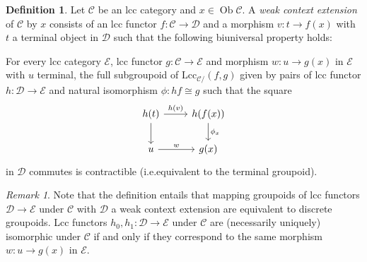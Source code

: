 \documentclass[a4paper]{article}
\theoremstyle{remark}
\newtheorem{remark}[theorem]{Remark}
\theoremstyle{definition}
\newtheorem{definition}[theorem]{Definition}
\begin{document}
\begin{definition}
  \label{def:weak-ext}
  Let $\mathcal{C}$ be an lcc category and $x \in \operatorname{Ob} \mathcal{C}$.
  A \emph{weak context extension} of $\mathcal{C}$ by $x$ consists of an lcc functor $f : \mathcal{C} \rightarrow \mathcal{D}$ and a morphism $v : t \rightarrow f(x)$ with $t$ a terminal object in $\mathcal{D}$ such that the following biuniversal property holds:

  For every lcc category $\mathcal{E}$, lcc functor $g : \mathcal{C} \rightarrow \mathcal{E}$ and morphism $w : u \rightarrow g(x)$ in $\mathcal{E}$ with $u$ terminal, the full subgroupoid of $\mathrm{Lcc}_{\mathcal{C} /}(f, g)$ given by pairs of lcc functor $h : \mathcal{D} \rightarrow \mathcal{E}$ and natural isomorphism $\phi : hf \cong g$ such that the square
  \begin{equation}
    \begin{tikzcd}
      h(t) \arrow[d] \arrow[r, "h(v)"] & h(f(x)) \arrow[d, "\phi_x"] \\
      u \arrow[r, "w"] & g(x)
    \end{tikzcd}
  \end{equation}
  in $\mathcal{D}$ commutes is contractible (i.e.\@ equivalent to the terminal groupoid).
\end{definition}

\begin{remark}
  \label{rem:discrete-weak-ext-mapping}
  Note that the definition entails that mapping groupoids of lcc functors $\mathcal{D} \rightarrow \mathcal{E}$ under $\mathcal{C}$ with $\mathcal{D}$ a weak context extension are equivalent to discrete groupoids.
  Lcc functors $h_0, h_1 : \mathcal{D} \rightarrow \mathcal{E}$ under $\mathcal{C}$ are (necessarily uniquely) isomorphic under $\mathcal{C}$ if and only if they correspond to the same morphism $w : u \rightarrow g(x)$ in $\mathcal{E}$.
\end{remark}
\end{document}
